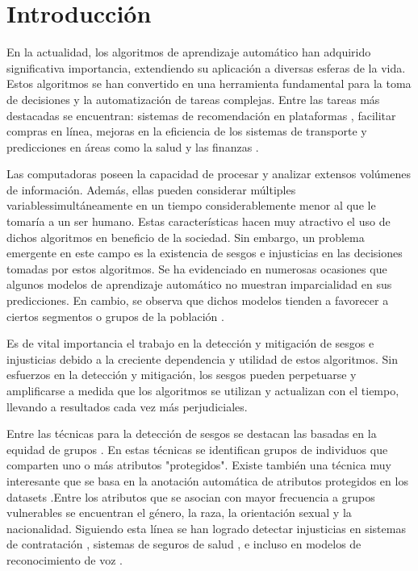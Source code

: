 \chapter*{Introducción}\label{chapter:introduction}
En la actualidad, los algoritmos de aprendizaje autom\'atico han adquirido significativa importancia, extendiendo su aplicaci\'on a 
diversas esferas de la vida. Estos algoritmos se han convertido en una herramienta fundamental para la toma de decisiones y la 
automatizaci\'on de tareas complejas. Entre las tareas m\'as destacadas se encuentran: sistemas de recomendaci\'on en 
plataformas \parencite{esmaeilzadeh2022abuse, bhattacharya2022augmenting}, facilitar compras en l\'inea, mejoras en la eficiencia 
de los sistemas de transporte \parencite{autonomous_driving} y predicciones en \'areas como la salud \parencite{roy2023machine} y 
las finanzas \parencite{sen2021machine}.

Las computadoras poseen la capacidad de procesar y analizar extensos vol\'umenes de informaci\'on. Adem\'as, ellas pueden considerar 
m\'ultiples variablessimult\'aneamente en un tiempo considerablemente menor al que le tomar\'ia a un ser humano. Estas caracter\'isticas 
hacen muy atractivo el uso de dichos algoritmos en beneficio de la sociedad. Sin embargo, un problema emergente en este campo es la 
existencia de sesgos e injusticias en las decisiones tomadas por estos algoritmos. Se ha evidenciado en numerosas ocasiones que algunos 
modelos de aprendizaje autom\'atico no muestran imparcialidad en sus predicciones. En cambio, se observa que dichos modelos tienden a 
favorecer a ciertos segmentos o grupos de la poblaci\'on \parencite{survey}.

Es de vital importancia el trabajo en la detecci\'on y mitigaci\'on de sesgos e injusticias debido a la creciente dependencia y 
utilidad de estos algoritmos. Sin esfuerzos en la detecci\'on y mitigaci\'on, los sesgos pueden perpetuarse y amplificarse a medida 
que los algoritmos se utilizan y actualizan con el tiempo, llevando a resultados cada vez m\'as perjudiciales.

Entre las t\'ecnicas para la detecci\'on de sesgos se destacan las basadas en la equidad de grupos \parencite{fairmodels}. 
En estas t\'ecnicas se identifican grupos de individuos que comparten uno o m\'as atributos "protegidos". Existe tambi\'en una 
t\'ecnica muy interesante que se basa en la anotaci\'on autom\'atica de atributos protegidos en los datasets 
\parencite{soumah2023radar,dinan2020multidimensional,10.1007/978-3-031-35320-8_39}.Entre los atributos que se asocian con mayor 
frecuencia a grupos vulnerables se encuentran el g\'enero, la raza, la orientaci\'on sexual y la nacionalidad. 
Siguiendo esta l\'inea se han logrado detectar injusticias en sistemas de contrataci\'on \parencite{examples_dis}, sistemas de 
seguros de salud \parencite{examples_dis}, e incluso en modelos de reconocimiento de voz \parencite{voice_bias}.

